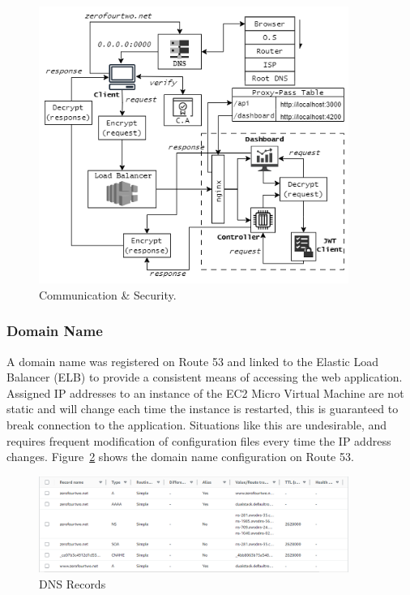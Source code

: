 \begin{figure}[h!]
    \includegraphics[width=0.9\textwidth]{images/comm_sec.png}
    \caption{Communication \& Security.}
    \label{image:comm_sec}
\end{figure}

\subsubsection*{Domain Name} A domain name was registered on Route 53 and linked to the Elastic Load Balancer (ELB) to provide a consistent means of 
accessing the web application. Assigned IP addresses to an instance of the EC2 Micro Virtual Machine are not static and will change each time the 
instance is restarted, this is guaranteed to break connection to the application. Situations like this are undesirable, and requires frequent 
modification of configuration files every time the IP address changes. Figure~\ref{image:dns_record} shows the domain name configuration on Route 53.

\begin{figure}[h!]
    \begin{center}
        \includegraphics[width=0.9\textwidth]{images/dns_record.png}
        \caption{DNS Records}
        \label{image:dns_record}
    \end{center}
\end{figure}


